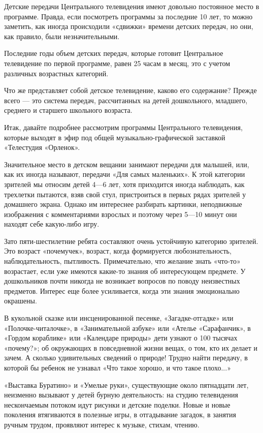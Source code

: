 \documentclass[12pt, a4paper, openany]{book}
\begin{document}
Детские передачи Центрального телевидения имеют довольно постоянное место в программе. Правда, если посмотреть программы за последние 10 лет, то можно заметить, как иногда происходили «сдвижки» времени детских передач, но они, как правило, были незначительными. 

Последние годы объем детских передач, которые готовит Центральное телевидение по первой программе, равен 25 часам в месяц, это с учетом различных возрастных категорий. 

Что же представляет собой детское телевидение, каково его содержание? Прежде всего — это система передач, рассчитанных на детей дошкольного, младшего, среднего и старшего школьного возраста. 

Итак, давайте подробнее рассмотрим программы Центрального телевидения, которые выходят в эфир под общей музыкально-графической заставкой «Телестудия «Орленок». 

Значительное место в детском вещании занимают передачи для малышей, или, как их иногда называют, передачи «Для самых маленьких». К этой категории зрителей мы относим детей 4—6 лет, хотя приходится иногда наблюдать, как трехлетки пытаются, взяв свой стул, пристроиться в первых рядах зрителей у домашнего экрана. Однако им интереснее разбирать картинки, неподвижные изображения с комментариями взрослых и поэтому через 5—10 минут они находят себе какую-либо игру. 

Зато пяти-шестилетние ребята составляют очень устойчивую категорию зрителей. Это возраст «почемучек», возраст, когда формируется любознательность, наблюдательность, пытливость. Примечательно, что желание знать «что-то» возрастает, если уже имеются какие-то знания об интересующем предмете. У дошкольников почти никогда не возникает вопросов по поводу неизвестных предметов. Интерес еще более усиливается, когда эти знания эмоционально окрашены. 

В кукольной сказке или инсценированной песенке, «Загадке-отгадке» или «Полочке-читалочке», в «Занимательной азбуке» или «Ателье «Сарафанчик», в «Гордом кораблике» или «Календаре природы» дети узнают о 100 тысячах «почему?»; об окружающих в повседневной жизни вещах, о том, кто их делает и зачем. А сколько удивительных сведений о природе! Трудно найти передачу, в которой бы ребенок не узнавал «Что такое хорошо, и что такое плохо...» 

«Выставка Буратино» и «Умелые руки», существующие около пятнадцати лет, неизменно вызывают у детей бурную деятельность: на студию телевидения нескончаемым потоком идут рисунки и детские поделки. Новые и новые поколения втягиваются в полезные игры, в отгадывание загадок, в занятия ручным трудом, проявляют интерес к музыке, стихам, чтению. 
\end{document}
